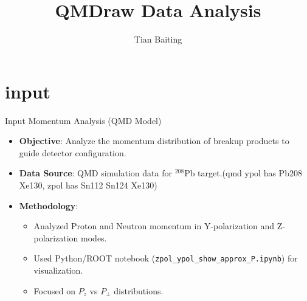 \documentclass[aspectratio=169]{beamer}
\title{QMDraw Data Analysis}
\author{Tian Baiting}
\institute{SAMURAI Collaboration}
\begin{document}
\begin{frame}
\titlepage
\end{frame}

\begin{frame}
\tableofcontents  
\end{frame}

\section{input}

\begin{frame}{Input Momentum Analysis (QMD Model)}
    \begin{itemize}
        \item \textbf{Objective}: Analyze the momentum distribution of breakup products to guide detector configuration.
        \item \textbf{Data Source}: QMD simulation data for $^{208}$Pb target.(qmd ypol has Pb208 Xe130, zpol has Sn112 Sn124 Xe130)
        \item \textbf{Methodology}:
        \begin{itemize}
            \item Analyzed Proton and Neutron momentum in Y-polarization and Z-polarization modes.
            \item Used Python/ROOT notebook (\texttt{zpol\_ypol\_show\_approx\_P.ipynb}) for visualization.
            \item Focused on $P_z$ vs $P_\perp$ distributions.
        \end{itemize}
    \end{itemize}
\end{frame}
\end{document}
